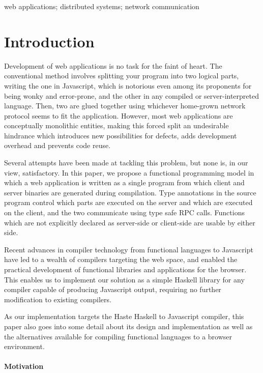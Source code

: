 \documentclass[preprint]{sigplanconf}
\begin{document}
%
\keywords
web applications; distributed systems; network communication

\section{Introduction}

Development of web applications is no task for the faint of heart.
The conventional method involves splitting your program into two logical parts,
writing the one in Javascript, which is notorious even among its proponents for
being wonky and error-prone, and the other in any compiled or
server-interpreted language. Then, two are glued together using whichever
home-grown network protocol seems to fit the application. However, most web
applications are conceptually monolithic entities, making this forced split an
undesirable hindrance which introduces new possibilities for defects, adds
development overhead and prevents code reuse.

Several attempts have been made at tackling this problem, but none is, in our
view, satisfactory. In this paper, we propose a functional programming model in
which a web application is written as a single program from which client and
server binaries are generated during compilation. Type annotations in the source
program control which parts are executed on the server and which are executed
on the client, and the two communicate using type safe RPC calls. Functions
which are not explicitly declared as server-side or client-side are usable by
either side.

Recent advances in compiler technology from functional languages to Javascript
have led to a wealth of compilers targeting the web space, and enabled the
practical development of functional libraries and applications for
the browser. This enables us to implement our solution as a simple Haskell
library for any compiler capable of producing Javascript output, requiring no
further modification to existing compilers.

As our implementation targets the Haste Haskell to Javascript compiler, this
paper also goes into some detail about its design and implementation as well
as the alternatives available for compiling functional languages to a browser
environment.

\paragraph{Motivation}
\end{document}
